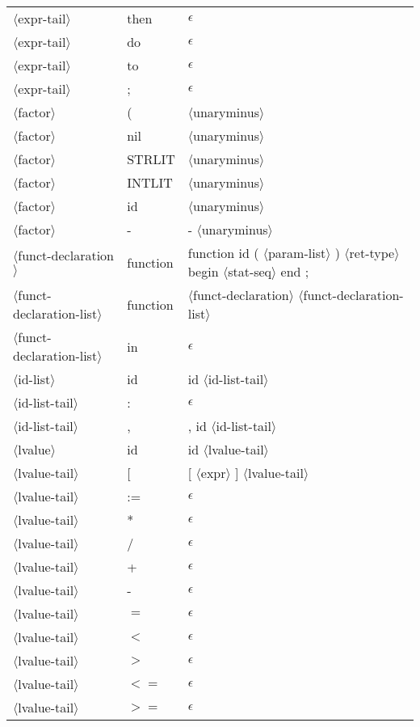 \documentclass[11pt, fleqn]{article}
\newcommand{\atag}[1]{$\langle$#1$\rangle$}
\begin{document}
\begin{longtable}{l|l|l}
\atag{expr-tail}					&	then		&	$\epsilon$		\\
\atag{expr-tail}					&	do		&	$\epsilon$		\\
\atag{expr-tail}					&	to		&	$\epsilon$		\\
\atag{expr-tail}					&	;		&	$\epsilon$		\\
\atag{factor}					&	(		&	\atag{unaryminus}		\\
\atag{factor}					&	nil		&	\atag{unaryminus}		\\
\atag{factor}					&	STRLIT	&	\atag{unaryminus}		\\
\atag{factor}					&	INTLIT	&	\atag{unaryminus}		\\
\atag{factor}					&	id		&	\atag{unaryminus}		\\
\atag{factor}					&	-		&	- \atag{unaryminus}		\\
\atag{funct-declaration}			&	function		&	function id ( \atag{param-list} ) \atag{ret-type} begin \atag{stat-seq} end ;	\\
\atag{funct-declaration-list}	&	function		&	\atag{funct-declaration} \atag{funct-declaration-list}	\\
\atag{funct-declaration-list}	&	in		&	$\epsilon$	\\
\atag{id-list}					&	id		&	id \atag{id-list-tail}	\\
\atag{id-list-tail}				&	:		&	$\epsilon$	\\
\atag{id-list-tail}				&	,		&	, id \atag{id-list-tail}	\\
\atag{lvalue}					&	id		&	id \atag{lvalue-tail}			\\
\atag{lvalue-tail}				&	[		&	[ \atag{expr} ] \atag{lvalue-tail}		\\
\atag{lvalue-tail}				&	:=		&	$\epsilon$											\\
\atag{lvalue-tail}				&	*		&	$\epsilon$											\\
\atag{lvalue-tail}				&	/		&	$\epsilon$											\\
\atag{lvalue-tail}				&	+		&	$\epsilon$											\\
\atag{lvalue-tail}				&	-		&	$\epsilon$											\\
\atag{lvalue-tail}				&	$=$		&	$\epsilon$											\\
\atag{lvalue-tail}				&	$<$		&	$\epsilon$											\\
\atag{lvalue-tail}				&	$>$		&	$\epsilon$											\\
\atag{lvalue-tail}				&	$<=$		&	$\epsilon$											\\
\atag{lvalue-tail}				&	$>=$		&	$\epsilon$											\\

\end{longtable}
\end{document}
